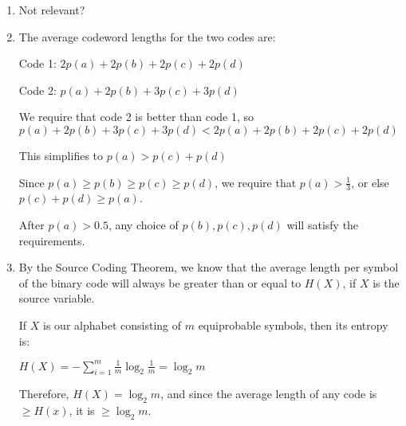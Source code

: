 


\begin{enumerate}[label=(\alph*)]

  \item
     Not relevant?

   \item
     The average codeword lengths for the two codes are:

     Code 1: $2p(a) + 2p(b) + 2p(c) + 2p(d)$

     Code 2: $p(a) + 2p(b) + 3p(c) + 3p(d)$

     We require that code 2 is better than code 1, so $p(a) + 2p(b) + 3p(c) + 3p(d) < 2p(a) + 2p(b) + 2p(c) + 2p(d)$

     This simplifies to $p(a) > p(c) + p(d)$

     Since $p(a) \geq p(b) \geq p(c) \geq p(d)$, we require that $p(a) > \frac{1}{3}$, or else $p(c) + p(d) \geq p(a)$.

     After $p(a) > 0.5$, any choice of $p(b), p(c), p(d)$ will satisfy the requirements.

   \item
     By the Source Coding Theorem, we know that the average length per symbol of the binary code will always be greater than or equal to $H(X)$, if $X$ is the source variable.

     If $X$ is our alphabet consisting of $m$ equiprobable symbols, then its entropy is:

     $H(X) = -\sum_{i=1}^m \frac{1}{m} \log_2 \frac{1}{m} = \log_2 m$

     Therefore, $H(X) = \log_2 m$, and since the average length of any code is $\geq H(x)$, it is $\geq \log_2 m$.
    \end{enumerate}

